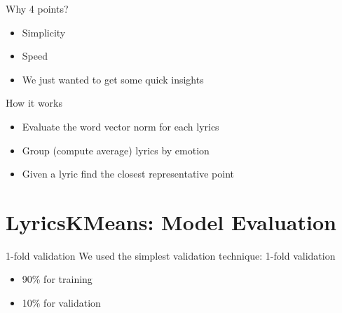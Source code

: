 \documentclass[xcolor=dvipsnames]{beamer}
\begin{document}
\begin{frame}{Why 4 points?}
\begin{itemize}
\item Simplicity
\item Speed
\item We just wanted to get some quick insights
\end{itemize}
\end{frame}

\begin{frame}{How it works}
\begin{itemize}
\item Evaluate the word vector norm for each lyrics
\item Group (compute average) lyrics by emotion
\item Given a lyric find the closest representative point
\end{itemize}
\end{frame}

\section{LyricsKMeans: Model Evaluation}

\begin{frame}{1-fold validation}
We used the simplest validation technique: 1-fold validation
\begin{itemize}
\item 90\% for training
\item 10\% for validation
\end{itemize}
\end{frame}
\end{document}
